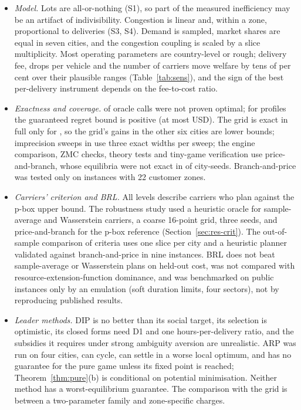 \documentclass[preprint,12pt]{elsarticle}
\theoremstyle{definition}
\theoremstyle{remark}
\begin{document}
\begin{itemize}[leftmargin=*,itemsep=2pt]
\item \emph{Model.} Lots are all-or-nothing (S1), so part of the measured inefficiency may be an artifact of indivisibility. Congestion is linear and, within a zone, proportional to deliveries (S3, S4). Demand is sampled, market shares are equal in seven cities, and the congestion coupling is scaled by a slice multiplicity. Most operating parameters are country-level or rough; delivery fee, drops per vehicle and the number of carriers move welfare by tens of per cent over their plausible ranges (Table~\ref{tab:sens}), and the sign of the best per-delivery instrument depends on the fee-to-cost ratio.
\item \emph{Exactness and coverage.} \ExUnproven{} of \ExCalls{} oracle calls were not proven optimal; for \ExBoundN{} profiles the guaranteed regret bound is positive (at most \ExBoundMax{} USD). The grid is exact in full only for \ExEtwoFullCities, so the grid's gains in the other six cities are lower bounds; imprecision sweeps in \ExEfourRedCities{} use three exact widths per sweep; the engine comparison, ZMC checks, theory tests and tiny-game verification use price-and-branch, whose equilibria were not exact in \ExOldBadN{} of \ExOldN{} city-seeds. Branch-and-price was tested only on instances with 22 customer zones.
\item \emph{Carriers' criterion and BRL.} All levels describe carriers who plan against the p-box upper bound. The robustness study used a heuristic oracle for sample-average and Wasserstein carriers, a coarse 16-point grid, three seeds, and price-and-branch for the p-box reference (Section~\ref{sec:res-crit}). The out-of-sample comparison of criteria uses one slice per city and a heuristic planner validated against branch-and-price in nine instances. BRL does not beat sample-average or Wasserstein plans on held-out cost, was not compared with resource-extension-function dominance, and was benchmarked on public instances only by an emulation (soft duration limits, four sectors), not by reproducing published results.
\item \emph{Leader methods.} DIP is no better than its social target, its selection is optimistic, its closed forms need D1 and one hours-per-delivery ratio, and the subsidies it requires under strong ambiguity aversion are unrealistic. ARP was run on four cities, can cycle, can settle in a worse local optimum, and has no guarantee for the pure game unless its fixed point is reached; Theorem~\ref{thm:pure}(b) is conditional on potential minimisation. Neither method has a worst-equilibrium guarantee. The comparison with the grid is between a two-parameter family and zone-specific charges.

\end{itemize}
\end{document}
